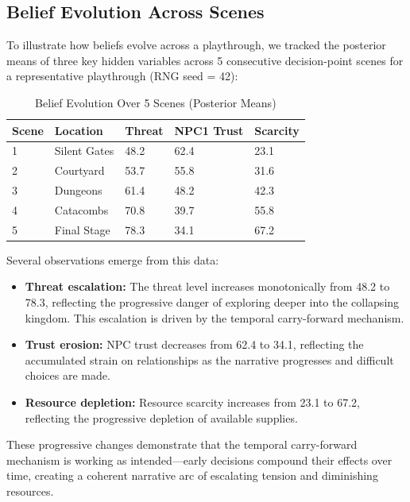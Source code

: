 \documentclass[journal]{IEEEtran}
\begin{document}
\subsection{Belief Evolution Across Scenes}

To illustrate how beliefs evolve across a playthrough, we tracked the posterior means of three key hidden variables across 5 consecutive decision-point scenes for a representative playthrough (RNG seed = 42):

\begin{table}[!ht]
\centering
\caption{Belief Evolution Over 5 Scenes (Posterior Means)}
\label{tab:evolution}
\small
\setlength{\tabcolsep}{3pt}
\begin{tabular}{|l|l|l|l|l|}
\hline
\textbf{Scene} & \textbf{Location} & \textbf{Threat} & \textbf{NPC1 Trust} & \textbf{Scarcity} \\
\hline
1 & Silent Gates & 48.2 & 62.4 & 23.1 \\
\hline
2 & Courtyard & 53.7 & 55.8 & 31.6 \\
\hline
3 & Dungeons & 61.4 & 48.2 & 42.3 \\
\hline
4 & Catacombs & 70.8 & 39.7 & 55.8 \\
\hline
5 & Final Stage & 78.3 & 34.1 & 67.2 \\
\hline
\end{tabular}
\vspace{-6pt}
\end{table}

Several observations emerge from this data:
\begin{itemize}
\item \textbf{Threat escalation:} The threat level increases monotonically from 48.2 to 78.3, reflecting the progressive danger of exploring deeper into the collapsing kingdom. This escalation is driven by the temporal carry-forward mechanism.
\item \textbf{Trust erosion:} NPC trust decreases from 62.4 to 34.1, reflecting the accumulated strain on relationships as the narrative progresses and difficult choices are made.
\item \textbf{Resource depletion:} Resource scarcity increases from 23.1 to 67.2, reflecting the progressive depletion of available supplies.
\end{itemize}

These progressive changes demonstrate that the temporal carry-forward mechanism is working as intended---early decisions compound their effects over time, creating a coherent narrative arc of escalating tension and diminishing resources.
\end{document}
